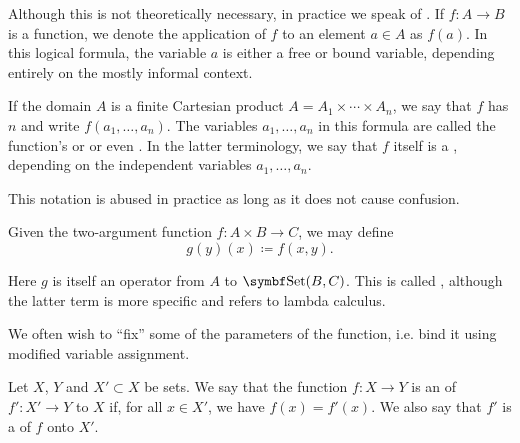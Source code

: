 \begin{definition}\label{def:function_arguments}
  Although this is not theoretically necessary, in practice we speak of . If \( f: A \to B \) is a function, we denote the application of \( f \) to an element \( a \in A \) as \( f(a) \). In this logical formula, the variable \( a \) is either a free or bound variable, depending entirely on the mostly informal context.

  If the domain \( A \) is a finite Cartesian product \( A = A_1 \times \cdots \times A_n \), we say that \( f \) has  \( n \) and write \( f(a_1, \ldots, a_n) \). The variables \( a_1, \ldots, a_n \) in this formula are called the function's  or  or even . In the latter terminology, we say that \( f \) itself is a , depending on the independent variables \( a_1, \ldots, a_n \).

  This notation is abused in practice as long as it does not cause confusion.

  Given the two-argument function \( f: A \times B \to C \), we may define
  \begin{equation*}
    g(y)(x) \coloneqq f(x, y).
  \end{equation*}

  Here \( g \) is itself an operator from \( A \) to \( \Cat{Set}(B, C) \). This is called , although the latter term is more specific and refers to lambda calculus.

  We often wish to \enquote{fix} some of the parameters of the function, i.e. bind it using modified variable assignment.
\end{definition}

\begin{definition}\label{def:function_extension}
  Let \( X \), \( Y \) and \( X' \subset X \) be sets. We say that the function \( f: X \to Y \) is an  of \( f': X' \to Y \) to \( X \) if, for all \( x \in X' \), we have \( f(x) = f'(x) \). We also say that \( f' \) is a  of \( f \) onto \( X' \).
\end{definition}

